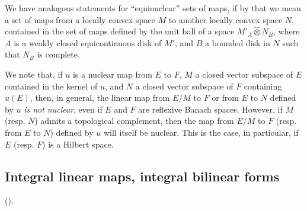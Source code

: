 \documentclass{article}
\theoremstyle{plain}
\newcommand{\hotimes}{\widehat{\otimes}}
\newcommand{\oldpage}[1]{\marginpar{\footnotesize$\Big\vert$ \textit{p.~#1}}}
\begin{document}
We have analogous statements for ``equinuclear'' sets of maps, if by that we mean a set of maps from a locally convex space $M$ to another locally convex space $N$, contained in
\oldpage{87}
the set of maps defined by the unit ball of a space $M'_A\hotimes N_B$, where $A$ is a weakly closed equicontinuous disk of $M'$, and $B$ a bounded disk in $N$ such that $N_B$ is complete.

We note that, if $u$ is a nuclear map from $E$ to $F$, $M$ a closed vector subspace of $E$ contained in the kernel of $u$, and $N$ a closed vector subspace of $F$ containing $u(E)$, then, in general, the linear map from $E/M$ to $F$ or from $E$ to $N$ defined by $u$ \emph{is not nuclear}, even if $E$ and $F$ are reflexive Banach spaces.
However, if $M$ (resp. $N$) admits a topological complement, then the map from $E/M$ to $F$ (resp. from $E$ to $N$) defined by $u$ will itself be nuclear.
This is the case, in particular, if $E$ (resp. $F$) is a Hilbert space.


\subsection{Integral linear maps, integral bilinear forms}
\label{1.8}

(\cite[chap.~1, \S4, n\textsuperscript{o}~3 and n\textsuperscript{o}~4]{PTT}).
\medskip
\end{document}
